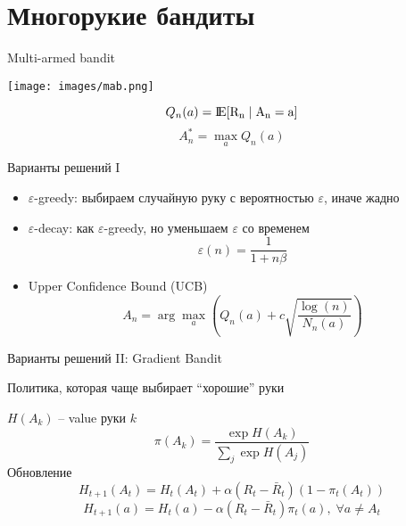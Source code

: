 \documentclass[11pt,aspectratio=169,handout]{beamer}
\begin{document}
\section{Многорукие бандиты}

\begin{frame}{Multi-armed bandit}

\begin{center}
\texttt{[image: images/mab.png]}
\end{center}

\[
Q_n(a) = \rm I\!E[R_n \mid A_n = a]
\]
\[
A^*_n = \max_a Q_n(a)
\]

\end{frame}

\begin{frame}{Варианты решений I \cite{BANDITS1}}

\begin{itemize}
\item $\varepsilon$-greedy: выбираем случайную руку с вероятностью $\varepsilon$, иначе жадно
\item $\varepsilon$-decay: как $\varepsilon$-greedy, но уменьшаем $\varepsilon$ со временем
\[
\varepsilon(n) = \frac{1}{1 + n \beta}
\]
\item Upper Confidence Bound (UCB)
\[
A_n = \arg \max_a \left( Q_n(a) + c \sqrt{\frac{\log(n)}{N_n(a)}} \right)
\]
\end{itemize}

\end{frame}

\begin{frame}{Варианты решений II: Gradient Bandit \cite{BANDITS2}}

Политика, которая чаще выбирает ``хорошие'' руки

$H(A_k)$ -- value руки $k$
\[
\pi(A_k) = \frac{\exp H(A_k)}{\sum_j \exp H(A_j)}
\]
Обновление
\[
H_{t+1} (A_t) = H_t(A_t) + \alpha (R_t - \bar R_t)(1 - \pi_t(A_t))
\]
\[
H_{t+1} (a) = H_t(a) - \alpha (R_t - \bar R_t)\pi_t(a), \; \forall a \neq A_t
\]

\end{frame}
\end{document}
